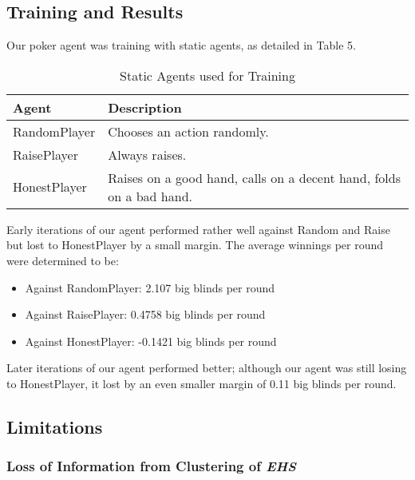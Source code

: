 \documentclass{article}
\begin{document}
\subsection{Training and Results}

Our poker agent was training with static agents, as detailed in Table 5.

\begin{table}[H]
  \begin{center}
    \begin{tabular}{|l|p{5cm}|}
    \hline
      \textbf{Agent} & \textbf{Description} \\
      \hline
      RandomPlayer & Chooses an action randomly. \\
      \hline
      RaisePlayer & Always raises.  \\
      \hline
      HonestPlayer & Raises on a good hand, calls on a decent hand, folds on a bad hand. \\
      \hline
    \end{tabular}
    \caption{Static Agents used for Training}
    \label{tab:table5}
  \end{center}
\end{table}

Early iterations of our agent performed rather well against Random and Raise but lost to HonestPlayer by a small margin.
The average winnings per round were determined to be:

\begin{itemize}
	\item Against RandomPlayer: 2.107 big blinds per round
	\item Against RaisePlayer: 0.4758 big blinds per round
	\item Against HonestPlayer: -0.1421 big blinds per round
\end{itemize}

Later iterations of our agent performed better; although our agent was still losing to HonestPlayer, it lost by an even smaller margin of 0.11 big blinds per round.

\subsection{Limitations}

\subsubsection{Loss of Information from Clustering of \textbf{\textit{EHS}}}
\end{document}
